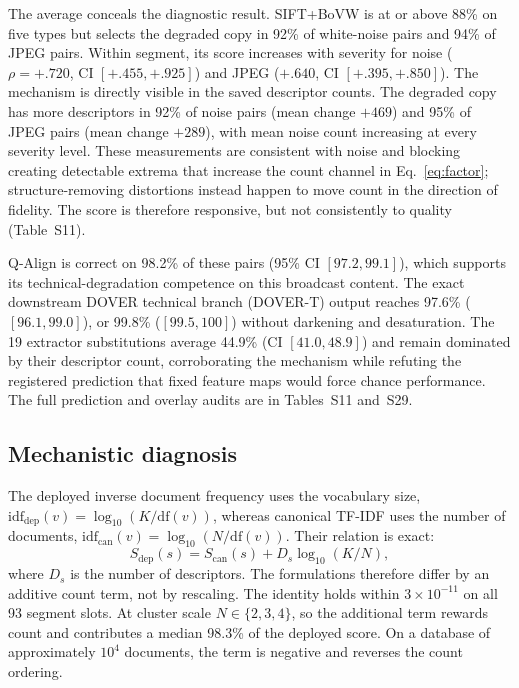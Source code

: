The average conceals the diagnostic result. SIFT+BoVW is at or above 88\% on
five types but selects the degraded copy in 92\% of white-noise pairs and 94\%
of JPEG pairs. Within segment, its score increases with severity for noise
($\rho=+.720$, CI $[+.455,+.925]$) and JPEG ($+.640$, CI
$[+.395,+.850]$). The mechanism is directly visible in the saved descriptor
counts. The degraded copy has more descriptors in 92\% of noise pairs (mean
change $+469$) and 95\% of JPEG pairs (mean change $+289$), with mean noise
count increasing at every severity level. These measurements are consistent
with noise and blocking creating detectable extrema that increase the count
channel in Eq.~\ref{eq:factor}; structure-removing distortions instead happen
to move count in the direction of fidelity. The score is therefore responsive,
but not consistently to quality (Table~S11).

Q-Align is correct on 98.2\% of these pairs (95\% CI $[97.2,99.1]$), which
supports its technical-degradation competence on this broadcast content. The exact downstream DOVER technical branch (DOVER-T) output
reaches 97.6\% ($[96.1,99.0]$), or 99.8\% ($[99.5,100]$) without darkening and
desaturation. The 19
extractor substitutions average 44.9\% (CI $[41.0,48.9]$) and remain dominated
by their descriptor count, corroborating the mechanism while refuting the
registered prediction that fixed feature maps would force chance performance.
The full prediction and overlay audits are in Tables~S11 and~S29.
\subsection{Mechanistic diagnosis}\label{sec:mechanism}

The deployed inverse document frequency uses the vocabulary size,
$\mathrm{idf}_{\mathrm{dep}}(v)=\log_{10}(K/\mathrm{df}(v))$, whereas canonical
TF-IDF uses the number of documents,
$\mathrm{idf}_{\mathrm{can}}(v)=\log_{10}(N/\mathrm{df}(v))$. Their relation is
exact:
\begin{equation}
S_{\mathrm{dep}}(s)=S_{\mathrm{can}}(s)+D_s\log_{10}(K/N),
\label{eq:idfrelation}
\end{equation}
where $D_s$ is the number of descriptors. The formulations therefore differ by
an additive count term, not by rescaling. The identity holds within
$3\times10^{-11}$ on all 93 segment slots. At cluster scale
$N\in\{2,3,4\}$, so the additional term rewards count and contributes a median
98.3\% of the deployed score. On a database of approximately $10^4$ documents,
the term is negative and reverses the count ordering.

